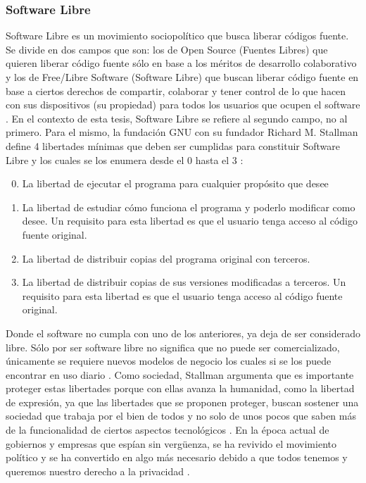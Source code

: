 \subsubsection{Software Libre}
Software Libre es un movimiento sociopolítico que busca liberar códigos fuente. Se divide en dos campos que son: los de Open Source (Fuentes Libres) que quieren liberar código fuente sólo en base a los méritos de desarrollo colaborativo y los de Free/Libre Software (Software Libre) que buscan liberar código fuente en base a ciertos derechos de compartir, colaborar y tener control de lo que hacen con sus dispositivos (su propiedad) para todos los usuarios que ocupen el software \citep{GNU-FLOSS-vs-FOSS} \citep{GNU-Open-vs-Free}. En el contexto de esta tesis, Software Libre se refiere al segundo campo, no al primero. Para el mismo, la fundación GNU con su fundador Richard M. Stallman define 4 libertades mínimas que deben ser cumplidas para constituir Software Libre y los cuales se los enumera desde el 0 hasta el 3 \citep{GNU-Freedom} \citep{GNU-Free-Software}:

\begin{enumerate}
  \setcounter{enumi}{-1}
  \item La libertad de ejecutar el programa para cualquier propósito que desee
  \item La libertad de estudiar cómo funciona el programa y poderlo modificar como desee. Un requisito para esta libertad es que el usuario tenga acceso al código fuente original.
  \item La libertad de distribuir copias del programa original con terceros.
  \item La libertad de distribuir copias de sus versiones modificadas a terceros. Un requisito para esta libertad es que el usuario tenga acceso al código fuente original.
\end{enumerate}

Donde el software no cumpla con uno de los anteriores, ya deja de ser considerado libre. Sólo por ser software libre no significa que no puede ser comercializado, únicamente se requiere nuevos modelos de negocio los cuales si se los puede encontrar en uso diario \citep{GNU-Free-Software}. Como sociedad, Stallman argumenta que es importante proteger estas libertades porque con ellas avanza la humanidad, como la libertad de expresión, ya que las libertades que se proponen proteger, buscan sostener una sociedad que trabaja por el bien de todos y no  solo de unos pocos que saben más de la funcionalidad de ciertos aspectos tecnológicos \citep{GNU-Open-vs-Free}. En la época actual de gobiernos y empresas que espían sin vergüenza, se ha revivido el movimiento político y se ha convertido en algo más necesario debido a que todos tenemos y  queremos nuestro derecho a la privacidad \citep{GNU-Freedom}.

